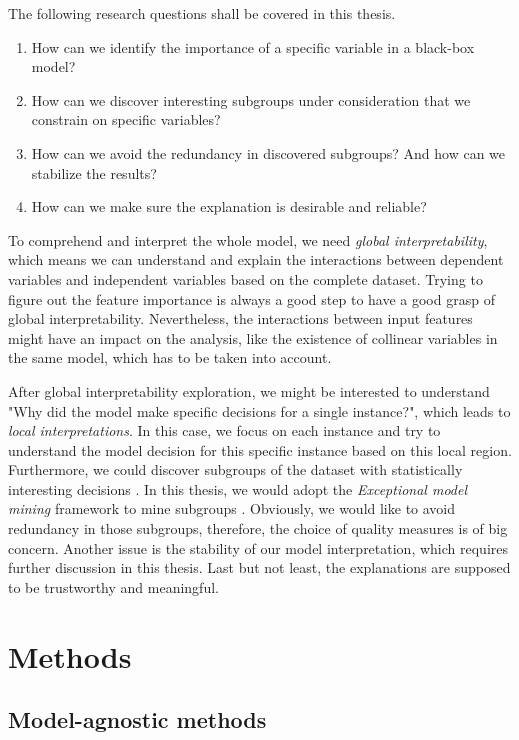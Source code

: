 \documentclass[runningheads]{llncs}
\begin{document}
	The following research questions shall be covered in this thesis. 
	
	\begin{enumerate}
		\item How can we identify the importance of a specific variable in a black-box model?
		\item How can we discover interesting subgroups under consideration that we constrain on specific variables?
		\item How can we avoid the redundancy in discovered subgroups? And how can we stabilize the results?
		\item How can we make sure the explanation is desirable and reliable?
	\end{enumerate}
	
	To comprehend and interpret the whole model, we need \textit{global interpretability}, which means we can understand and explain the interactions between dependent variables and independent variables based on the complete dataset. Trying to figure out the feature importance is always a good step to have a good grasp of global interpretability. Nevertheless, the interactions between input features might have an impact on the analysis, like the existence of collinear variables in the same model, which has to be taken into account.
	
	After global interpretability exploration, we might be interested to understand "Why did the model make specific decisions for a single instance?", which leads to \textit{local interpretations}. In this case, we focus on each instance and try to understand the model decision for this specific instance based on this local region. Furthermore, we could discover subgroups of the dataset with statistically interesting decisions \cite{wrobel2001inductive}. In this thesis, we would adopt the \textit{Exceptional model mining} framework to mine subgroups \cite{leman2008exceptional}. Obviously, we would like to avoid redundancy in those subgroups, therefore, the choice of quality measures is of big concern. Another issue is the stability of our model interpretation, which requires further discussion in this thesis. Last but not least, the explanations are supposed to be trustworthy and meaningful. 
	
	\section{Methods}
	
	\subsection{Model-agnostic methods}
	
\end{document}
